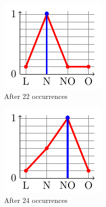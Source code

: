 \begin{figure}
\begin{subfigure}[t]{.15\linewidth}
\includegraphics[width=\linewidth]{plot_tikz/speed22.pdf}
\caption{After 22 occurrences}
\label{fig:e}
\end{subfigure}
\begin{subfigure}[t]{.15\linewidth}
\includegraphics[width=\linewidth]{plot_tikz/speed24.pdf}
\caption{After 24 occurrences}
\label{fig:f}
\end{subfigure}
\begin{subfigure}[t]{.15\linewidth}

\end{subfigure}
\end{figure}
